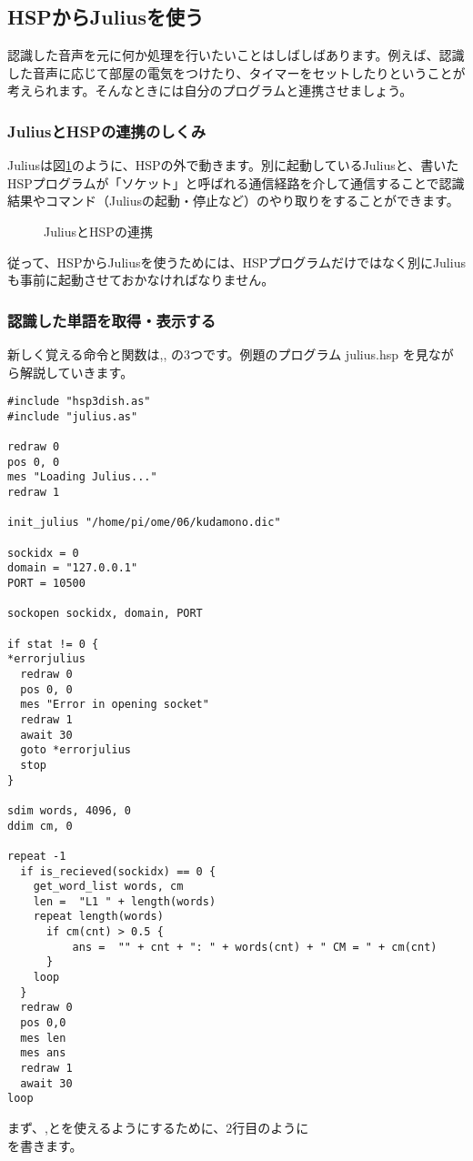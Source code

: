 \subsection{HSPからJuliusを使う}
認識した音声を元に何か処理を行いたいことはしばしばあります。例えば、認識した音声に応じて部屋の電気をつけたり、タイマーをセットしたりということが考えられます。そんなときには自分のプログラムと連携させましょう。
\subsubsection{JuliusとHSPの連携のしくみ}
Juliusは図\ref{JuliusとHSPの連携}のように、HSPの外で動きます。別に起動しているJuliusと、書いたHSPプログラムが「ソケット」と呼ばれる通信経路を介して通信することで認識結果やコマンド（Juliusの起動・停止など）のやり取りをすることができます。
\begin{figure}[H]
\begin{center}
    
    \caption{JuliusとHSPの連携}
    \label{JuliusとHSPの連携}
\end{center}
\end{figure}
従って、HSPからJuliusを使うためには、HSPプログラムだけではなく別にJuliusも事前に起動させておかなければなりません。

\subsubsection{認識した単語を取得・表示する}
新しく覚える命令と関数は,,  の3つです。例題のプログラム julius.hsp を見ながら解説していきます。\\
\begin{lstlisting}[caption=julius.hsp,label=julius.hsp]
#include "hsp3dish.as"
#include "julius.as"

redraw 0
pos 0, 0
mes "Loading Julius..."
redraw 1

init_julius "/home/pi/ome/06/kudamono.dic"

sockidx = 0
domain = "127.0.0.1"
PORT = 10500

sockopen sockidx, domain, PORT

if stat != 0 {
*errorjulius
  redraw 0
  pos 0, 0
  mes "Error in opening socket"
  redraw 1
  await 30
  goto *errorjulius
  stop
}

sdim words, 4096, 0
ddim cm, 0

repeat -1
  if is_recieved(sockidx) == 0 {
    get_word_list words, cm
    len =  "L1 " + length(words)
    repeat length(words)
      if cm(cnt) > 0.5 {
          ans =  "" + cnt + ": " + words(cnt) + " CM = " + cm(cnt)
      }
    loop
  }
  redraw 0
  pos 0,0
  mes len
  mes ans
  redraw 1
  await 30
loop
\end{lstlisting}
まず、,とを使えるようにするために、2行目のように\\
を書きます。

